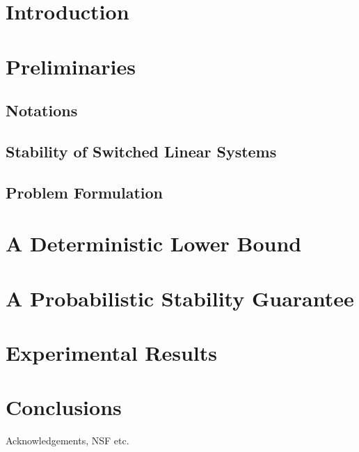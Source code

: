 \documentclass[twocolumn]{autart}
\begin{document}
\section{Introduction}


\section{Preliminaries}\label{sec:preliminaries}
\subsection{Notations}
 
\subsection{Stability of Switched Linear Systems}\label{sec:stab}

\subsection{Problem Formulation}


\section{A Deterministic Lower Bound}\label{sec:lowerBound}


\section{A Probabilistic Stability Guarantee}\label{sec:upperbound}



\section{Experimental Results}\label{sec:experiments}
%

\section{Conclusions}\label{sec:conclusions}



\begin{ack}                               %
Acknowledgements, NSF etc.  %
\end{ack}

 

\end{document}
